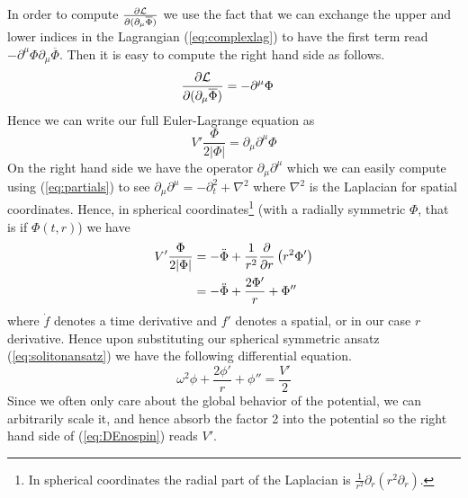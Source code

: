 In order to compute \(\pdv{\mathcal{L}}{(\partial_\mu\overline{\Phi})}\) we use the
fact that we can exchange the upper and lower indices in the Lagrangian
(\ref{eq:complexlag}) to have the first term read \(-\partial^\mu\Phi\partial_\mu\overline{\Phi}\).
Then it is easy to compute the right hand side as follows.
\begin{align}
    \pdv{\mathcal{L}}{(\partial_\mu\overline{\Phi})} & = -\partial^\mu\Phi
\end{align}
Hence we can write our full Euler-Lagrange equation as
\begin{equation}
    V'\frac{\Phi}{2|\Phi|} = \partial_\mu\partial^\mu\Phi
\end{equation}
On the right hand side we have the operator \(\partial_\mu\partial^\mu\) which
we can easily compute using (\ref{eq:partials}) to see \(\partial_\mu\partial^\mu = -\partial_t^2 + \nabla^2\)
where \(\nabla^2\) is the Laplacian for spatial coordinates. Hence, in spherical
coordinates\footnote{In spherical coordinates the radial part of the Laplacian
    is \(\frac{1}{r^2}\partial_r\left(r^2\partial_r\right)\).} (with a radially
symmetric \(\Phi\), that is if \(\Phi(t,r)\)) we have
\begin{align}
    V'\frac{\Phi}{2|\Phi|} & = -\ddot{\Phi} + \frac{1}{r^2}\pdv{r}\left(r^2\Phi'\right) \\
                           & = -\ddot{\Phi} + \frac{2\Phi'}{r} + \Phi''
\end{align}
where \(\dot{f}\) denotes a time derivative and \(f'\) denotes a spatial, or in
our case \(r\) derivative. Hence upon substituting our spherical symmetric
ansatz (\ref{eq:solitonansatz}) we have the following differential equation.
\begin{equation}\label{eq:DEnospin}
    \omega^2\phi + \frac{2\phi'}{r} + \phi'' = \frac{V'}{2}
\end{equation}
Since we often only care about the global behavior of the potential, we can
arbitrarily scale it, and hence absorb the factor 2 into the potential so the
right hand side of (\ref{eq:DEnospin}) reads \(V'\).

